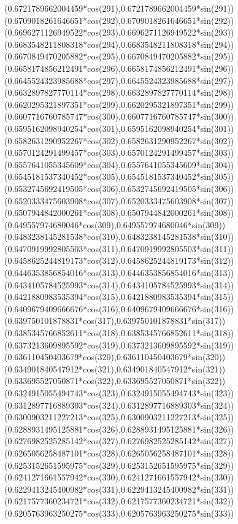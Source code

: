 {({0.6721789662004459*cos(291)},{0.6721789662004459*sin(291)})
({0.6709018261646651*cos(292)},{0.6709018261646651*sin(292)})
({0.6696271126949522*cos(293)},{0.6696271126949522*sin(293)})
({0.6683548211808318*cos(294)},{0.6683548211808318*sin(294)})
({0.6670849470205882*cos(295)},{0.6670849470205882*sin(295)})
({0.6658174856212491*cos(296)},{0.6658174856212491*sin(296)})
({0.6645524323985688*cos(297)},{0.6645524323985688*sin(297)})
({0.6632897827770114*cos(298)},{0.6632897827770114*sin(298)})
({0.6620295321897351*cos(299)},{0.6620295321897351*sin(299)})
({0.6607716760785747*cos(300)},{0.6607716760785747*sin(300)})
({0.6595162098940254*cos(301)},{0.6595162098940254*sin(301)})
({0.6582631290952267*cos(302)},{0.6582631290952267*sin(302)})
({0.6570124291499457*cos(303)},{0.6570124291499457*sin(303)})
({0.6557641055345609*cos(304)},{0.6557641055345609*sin(304)})
({0.6545181537340452*cos(305)},{0.6545181537340452*sin(305)})
({0.6532745692419505*cos(306)},{0.6532745692419505*sin(306)})
({0.6520333475603908*cos(307)},{0.6520333475603908*sin(307)})
({0.6507944842000261*cos(308)},{0.6507944842000261*sin(308)})
({0.649557974680046*cos(309)},{0.649557974680046*sin(309)})
({0.6483238145281538*cos(310)},{0.6483238145281538*sin(310)})
({0.6470919992805503*cos(311)},{0.6470919992805503*sin(311)})
({0.6458625244819173*cos(312)},{0.6458625244819173*sin(312)})
({0.6446353856854016*cos(313)},{0.6446353856854016*sin(313)})
({0.6434105784525993*cos(314)},{0.6434105784525993*sin(314)})
({0.6421880983535394*cos(315)},{0.6421880983535394*sin(315)})
({0.6409679409666676*cos(316)},{0.6409679409666676*sin(316)})
({0.639750101878831*cos(317)},{0.639750101878831*sin(317)})
({0.6385345766852611*cos(318)},{0.6385345766852611*sin(318)})
({0.6373213609895592*cos(319)},{0.6373213609895592*sin(319)})
({0.636110450403679*cos(320)},{0.636110450403679*sin(320)})
({0.634901840547912*cos(321)},{0.634901840547912*sin(321)})
({0.633695527050871*cos(322)},{0.633695527050871*sin(322)})
({0.6324915055494743*cos(323)},{0.6324915055494743*sin(323)})
({0.6312897716889303*cos(324)},{0.6312897716889303*sin(324)})
({0.6300903211227213*cos(325)},{0.6300903211227213*sin(325)})
({0.6288931495125881*cos(326)},{0.6288931495125881*sin(326)})
({0.6276982525285142*cos(327)},{0.6276982525285142*sin(327)})
({0.6265056258487101*cos(328)},{0.6265056258487101*sin(328)})
({0.6253152651595975*cos(329)},{0.6253152651595975*sin(329)})
({0.6241271661557942*cos(330)},{0.6241271661557942*sin(330)})
({0.6229413245400982*cos(331)},{0.6229413245400982*sin(331)})
({0.6217577360234721*cos(332)},{0.6217577360234721*sin(332)})
({0.6205763963250275*cos(333)},{0.6205763963250275*sin(333)})
}
